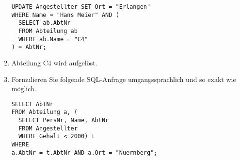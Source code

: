 \documentclass{lehramt-informatik-minimal}
\begin{document}
\begin{enumerate}
\begin{antwort}[muster]
\begin{verbatim}
UPDATE Angestellter SET Ort = "Erlangen"
WHERE Name = "Hans Meier" AND (
  SELECT ab.AbtNr
  FROM Abteilung ab
  WHERE ab.Name = "C4"
) = AbtNr;
\end{verbatim}
\end{antwort}


\item Abteilung C4 wird aufgelöst.


\item Formulieren Sie folgende SQL-Anfrage umgangssprachlich und so
exakt wie möglich.

\begin{verbatim}
SELECT AbtNr
FROM Abteilung a, (
  SELECT PersNr, Name, AbtNr
  FROM Angestellter
  WHERE Gehalt < 2000) t
WHERE
a.AbtNr = t.AbtNr AND a.Ort = "Nuernberg";
\end{verbatim}

\end{enumerate}
\end{document}
